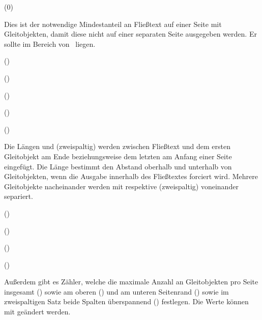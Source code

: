 \begin{Entity}{}
\begin{Declaration}
  {}
  (0\textfraction)
\printdeclarationlist

Dies ist der notwendige Mindestanteil an Fließtext auf einer Seite mit 
Gleitobjekten, damit diese nicht auf einer separaten Seite ausgegeben werden. 
Er sollte im Bereich von~ liegen.
\end{Declaration}

\begin{Declaration}
  {}
  (\the\textfloatsep)
\begin{Declaration}
  {}
  (\the\dbltextfloatsep)
\begin{Declaration}
  {}
  (\the\intextsep)
\begin{Declaration}
  {}
  (\the\floatsep)
\begin{Declaration}
  {}
  (\the\dblfloatsep)
\printdeclarationlist

Die Längen  und  (zweispaltig) 
werden zwischen Fließtext und dem ersten Gleitobjekt am Ende beziehungsweise 
dem letzten am Anfang einer Seite eingefügt. Die Länge  
bestimmt den Abstand oberhalb und unterhalb von Gleitobjekten, wenn die Ausgabe 
innerhalb des Fließtextes forciert wird. Mehrere Gleitobjekte nacheinander 
werden mit  respektive  
(zweispaltig) voneinander separiert.
\end{Declaration}
\end{Declaration}
\end{Declaration}
\end{Declaration}
\end{Declaration}

\begin{Declaration}
  {}
  ()
\begin{Declaration}
  {}
  ()
\begin{Declaration}
  {}
  ()
\begin{Declaration}
  {}
  ()
\printdeclarationlist[Zähler]

Außerdem gibt es Zähler, welche die maximale Anzahl an Gleitobjekten pro Seite 
insgesamt () sowie am oberen () 
und am unteren Seitenrand () sowie im zweispaltigen 
Satz beide Spalten überspannend () festlegen. Die Werte 
können mit  geändert werden.
\end{Declaration}
\end{Declaration}
\end{Declaration}
\end{Declaration}


\end{Entity}
